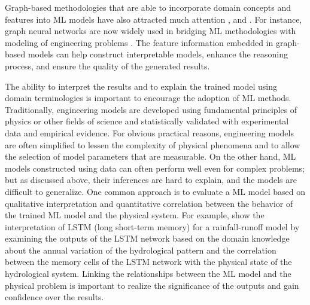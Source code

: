Graph-based methodologies that are able to incorporate domain concepts and features into ML models have also attracted much attention \citep{koller2009probabilistic, baru2017open, hamilton2017representation},  and \citep{wu2020comprehensive}. For instance, graph neural networks are now widely used in bridging ML methodologies with modeling of engineering problems \citep{seo2019differentiable,park2019physicsinduced}. The feature information embedded in graph-based models can help construct interpretable models, enhance the reasoning process, and ensure the quality of the generated results. 

The ability to interpret the results and to explain the trained model using domain terminologies is important to encourage the adoption of ML methods. Traditionally, engineering models are developed using fundamental principles of physics or other fields of science and statistically validated with experimental data and empirical evidence. For obvious practical reasons, engineering models are often simplified to lessen the complexity of physical phenomena and to allow the selection of model parameters that are measurable. On the other hand, ML models constructed using data can often perform well even for complex problems; but as discussed above, their inferences are hard to explain, and the models are difficult to generalize. One common approach is to evaluate a ML model based on qualitative interpretation and quantitative correlation between the behavior of the trained ML model and the physical system. For example, \citet{kratzert2019neuralhydrology} show the interpretation of LSTM (long short-term memory) for a rainfall-runoff model by examining the outputs of the LSTM network based on the domain knowledge about the annual variation of the hydrological pattern and the correlation between the memory cells of the LSTM network with the physical state of the hydrological system. Linking the relationships between the ML model and the physical problem is important to realize the significance of the outputs and gain confidence over the results. 

